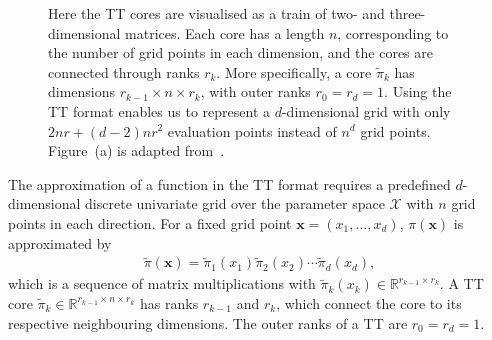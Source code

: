 \begin{figure}[ht!]
	\centering
	\begin{subfigure}{\textwidth}
		
		\caption{}
	\end{subfigure}
	\centering
	\begin{subfigure}{\textwidth}
		\caption{}
	\end{subfigure}
	\caption[Visualisation of a tensor train]{Here the TT cores are visualised as a train of two- and three-dimensional matrices. 
		Each core has a length $n$, corresponding to the number of grid points in each dimension, and the cores are connected through ranks $r_k$. 
		More specifically, a core $\tilde{\pi}_k$ has dimensions $r_{k-1} \times n \times r_k$, with outer ranks $r_0 = r_d = 1$.
		Using the TT format enables us to represent a $d$-dimensional grid with only $2nr + (d-2)nr^2$ evaluation points instead of $n^d$ grid points.
		Figure~(a) is adapted from~\cite{fox2021grid}.}
	\label{fig:TTfig}
\end{figure}
The approximation of a function in the TT format requires a predefined $d$-dimensional discrete univariate grid over the parameter space $\mathcal{X}$ with $n$ grid points in each direction.
For a fixed grid point $\bm{x} = (x_1, \dots, x_d)$,  $\pi(\bm{x})$ is approximated by
\begin{align*}
	\tilde{\pi}(\bm{x}) = 	\tilde{\pi}_1(x_1)  \tilde{\pi}_2(x_2)  \cdots \tilde{\pi}_d(x_d),
\end{align*}
which is a sequence of matrix multiplications with $\tilde{\pi}_k(x_k) \in \mathbb{R}^{r_{k-1} \times r_k}$.
A TT core $\tilde{\pi}_k \in \mathbb{R}^{r_{k-1} \times n \times r_k}$ has ranks $ r_{k-1}$ and $r_k$, which connect the core to its respective neighbouring dimensions.
The outer ranks of a TT are $r_0 = r_d = 1$.
